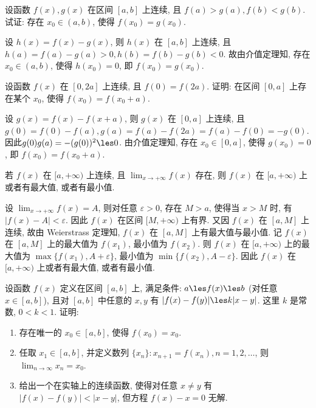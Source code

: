 \begin{exercise}[2.2.5]
    设函数 $f(x), g(x)$ 在区间 $[a,b]$ 上连续, 且 $f(a) > g(a), f(b) < g(b)$. 试证: 存在 $x_0 \in (a,b)$, 使得 $f(x_0)=g(x_0)$.
\end{exercise}

\begin{solution}
    设 $h(x) = f(x) - g(x)$, 则 $h(x)$ 在 $[a,b]$ 上连续, 且 $h(a) = f(a) - g(a) > 0, h(b) = f(b) - g(b) < 0$. 故由介值定理知, 存在 $x_0 \in (a,b)$, 使得 $h(x_0) = 0$, 即 $f(x_0) = g(x_0)$.
\end{solution}

\begin{exercise}[2.2.6]
    设函数 $f(x)$ 在 $[0, 2a]$ 上连续, 且 $f(0)=f(2a)$. 证明: 在区间 $[0,a]$ 上存在某个 $x_0$, 使得 $f(x_0) = f(x_0+a)$.
\end{exercise}

\begin{solution}
    设 $g(x) = f(x) - f(x+a)$, 则 $g(x)$ 在 $[0,a]$ 上连续, 且 $g(0) = f(0) - f(a), g(a) = f(a) - f(2a) = f(a) - f(0) = -g(0)$. 因此$g(0) g(a) = -(g(0))^2 \les 0$. 由介值定理知, 存在 $x_0 \in [0,a]$, 使得 $g(x_0) = 0$, 即 $f(x_0) = f(x_0+a)$.
\end{solution}

\begin{exercise}[2.2.17]
    若 $f(x)$ 在 $[a, +\infty)$ 上连续, 且 $\lim_{x \to +\infty} f(x)$ 存在, 则 $f(x)$ 在 $[a, +\infty)$ 上或者有最大值, 或者有最小值.
\end{exercise}

\begin{solution}
    设 $\lim_{x \to +\infty} f(x) = A$, 则对任意 $\varepsilon > 0$, 存在 $M > a$, 使得当 $x > M$ 时, 有 $|f(x) - A| < \varepsilon$. 因此 $f(x)$ 在区间 $[M, +\infty)$ 上有界. 又因 $f(x)$ 在 $[a,M]$ 上连续, 故由 Weierstrass 定理知, $f(x)$ 在 $[a,M]$ 上有最大值与最小值. 记 $f(x)$ 在 $[a,M]$ 上的最大值为 $f(x_1)$, 最小值为 $f(x_2)$. 则 $f(x)$ 在 $[a,+\infty)$ 上的最大值为 $\max\{f(x_1), A+\varepsilon\}$, 最小值为 $\min\{f(x_2), A-\varepsilon\}$. 因此 $f(x)$ 在 $[a,+\infty)$ 上或者有最大值, 或者有最小值.
\end{solution}

\begin{exercise}[2.2.18]
    设函数 $f(x)$ 定义在区间 $[a,b]$ 上, 满足条件: $a \les f(x) \les b$ (对任意 $x \in [a,b]$), 且对 $[a,b]$ 中任意的 $x,y$ 有 $|f(x)-f(y)| \les k|x-y|$. 这里 $k$ 是常数, $0<k<1$. 证明:
    \begin{enumerate}
        \item 存在唯一的 $x_0 \in [a,b]$, 使得 $f(x_0)=x_0$.
        \item 任取 $x_1 \in [a,b]$, 并定义数列 $\{x_n\}: x_{n+1} = f(x_n), n=1,2,\dots$, 则 $\lim_{n \to \infty} x_n = x_0$.
        \item 给出一个在实轴上的连续函数, 使得对任意 $x \ne y$ 有 $|f(x)-f(y)| < |x-y|$, 但方程 $f(x)-x=0$ 无解.
    \end{enumerate}
\end{exercise}


